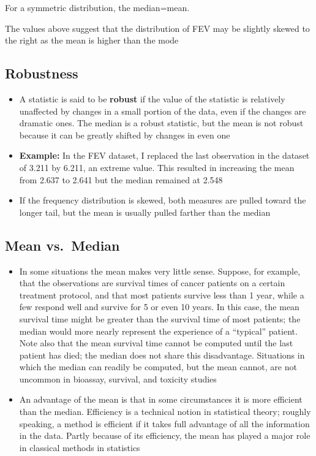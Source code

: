 \documentclass[
]{book}
\providecommand{\tightlist}{%
  \setlength{\itemsep}{0pt}\setlength{\parskip}{0pt}}
\begin{document}
For a symmetric distribution, the median=mean.

The values above suggest that the distribution of FEV may be slightly skewed to the right as the mean is higher than the mode

\hypertarget{robustness}{%
\subsection{Robustness}\label{robustness}}

\begin{itemize}
\tightlist
\item
  A statistic is said to be \textbf{robust} if the value of the statistic is relatively unaffected by changes in a small portion of the data, even if the changes are dramatic ones. The median is a robust statistic, but the mean is not robust because it can be greatly shifted by changes in even one
\item
  \textbf{Example:} In the FEV dataset, I replaced the last observation in the dataset of 3.211 by 6.211, an extreme value. This resulted in increasing the mean from 2.637 to 2.641 but the median remained at 2.548
\item
  If the frequency distribution is skewed, both measures are pulled toward the longer tail, but the mean is usually pulled farther than the median
\end{itemize}

\hypertarget{mean-vs.-median}{%
\subsection{Mean vs.~Median}\label{mean-vs.-median}}

\begin{itemize}
\tightlist
\item
  In some situations the mean makes very little sense. Suppose, for example, that the observations are survival times of cancer patients on a certain treatment protocol, and that most patients survive less than 1 year, while a few respond well and survive for 5 or even 10 years. In this case, the mean survival time might be greater than the survival time of most patients; the median would more nearly represent the experience of a ``typical'' patient. Note also that the mean survival time cannot be computed until the last patient has died; the median does not share this disadvantage. Situations in which the median can readily be computed, but the mean cannot, are not uncommon in bioassay, survival, and toxicity studies
\item
  An advantage of the mean is that in some circumstances it is more efficient than the median. Efficiency is a technical notion in statistical theory; roughly speaking, a method is efficient if it takes full advantage of all the information in the data. Partly because of its efficiency, the mean has played a major role in classical methods in statistics
\end{itemize}
\end{document}
